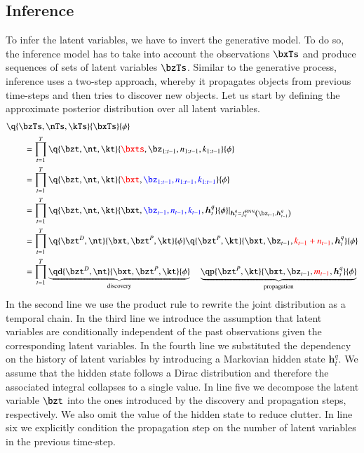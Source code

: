 \subsection{Inference}
To infer the latent variables, we have to invert the generative model. To do so, the inference model has to take into account the observations $\bxTs$ and produce sequences of sets of latent variables $\bzTs$. Similar to the generative process, inference uses a two-step approach, whereby it propagates objects from previous time-steps and then tries to discover new objects. Let us start by defining the approximate posterior distribution over all latent variables.
\begin{equation}
\begin{aligned}
    &\q{\bzTs, \nTs, \kTs}{\bxTs}{\phi} \\
%    
    &\qquad= \prod_{t=1}^T  \q{\bzt, \nt, \kt}{\textcolor{red}{\bxts}, \bz_{1:t-1}, n_{1:t-1}, k_{1:t-1}}{\phi}\\
%    
    &\qquad= \prod_{t=1}^T  \q{\bzt, \nt, \kt}{\textcolor{red}{\bxt}, \textcolor{blue}{\bz_{1:t-1}, n_{1:t-1}, k_{1:t-1}}}{\phi}\\
%    
    &\qquad= \prod_{t=1}^T  \q{\bzt, \nt, \kt}{\bxt, \textcolor{blue}{\bz_{t-1}, n_{t-1}, k_{t-1}}, \bm{h}_t^q}{\phi}\lvert_{\bm{h}_t^q = f^{\mathrm{RNN}}_q \left( \bz_{t-1}, \bm{h}_{t-1}^q \right)} \\
%    
    &\qquad= \prod_{t=1}^T  \q{\bzt^D, \nt}{\bxt, \bzt^P, \kt}{\phi} \q{\bzt^P, \kt}{\bxt, \bz_{t-1}, \textcolor{red}{k_{t-1} + n_{t-1}}, \bm{h}_t^q}{\phi} \\
%    
    &\qquad= \prod_{t=1}^T  \underbrace{ \qd{\bzt^D, \nt}{\bxt, \bzt^P, \kt}{\phi}}_\mathrm{discovery} \quad \underbrace{\qp{\bzt^P, \kt}{\bxt, \bz_{t-1}, \textcolor{red}{m_{t-1}}, \bm{h}_t^q}{\phi}}_\mathrm{propagation} 
\end{aligned}
\end{equation}
In the second line we use the product rule to rewrite the joint distribution as a temporal chain. In the third line we introduce the assumption that latent variables are conditionally independent of the past observations given the corresponding latent variables. In the fourth line we substituted the dependency on the history of latent variables by introducing a Markovian hidden state $\bm{h}_t^q$. We assume that the hidden state follows a Dirac distribution and therefore the associated integral collapses to a single value. In line five we decompose the latent variable $\bzt$ into the ones introduced by the discovery and propagation steps, respectively. We also omit the value of the hidden state to reduce clutter. In line six we explicitly condition the propagation step on the number of latent variables in the previous time-step.


